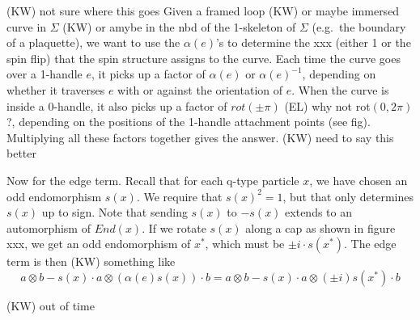 \documentclass[12pt,a4paper]{article}
\newcommand\be            {\begin{equation}}
\newcommand\ee            {\end{equation}}
\newcommand{\kw}[1]{{\color{kwcolor}\footnotesize{(KW) #1}}}
\newcommand{\ethan}[1]{{\color{amethyst}\footnotesize{(EL) #1}}}
\begin{document}
\kw{not sure where this goes}
Given a framed loop \kw{or maybe immersed curve} in $\Sigma$ 
\kw{or amybe in the nbd of the 1-skeleton of $\Sigma$} (e.g.\ the boundary of a plaquette), 
we want to use the $\alpha(e)$'s
to determine the xxx (either 1 or the spin flip) that the spin structure assigns to the curve.
Each time the curve goes over a 1-handle $e$, it picks up a factor of $\alpha(e)$
or $\alpha(e)^{-1}$, depending on whether it traverses $e$ with or against the orientation of $e$.
When the curve is inside a 0-handle, it also picks up a factor
of $rot(\pm\pi)$ \ethan{why not rot$(0,2\pi)$?}, depending on the positions of the 1-handle attachment points (see fig).
Multiplying all these factors together gives the answer.
\kw{need to say this better}

Now for the edge term.
Recall that for each q-type particle $x$, we have chosen an odd endomorphism $s(x)$.
We require that $s(x)^2 = 1$, but that only determines $s(x)$ up to sign.
Note that sending $s(x)$ to $-s(x)$ extends to an automorphism of $End(x)$.
If we rotate $s(x)$ along a cap as shown in figure xxx, we get an odd endomorphism of $x^*$,
which must be $\pm i \cdot s(x^*)$.
The edge term is then \kw{something like}
\be
	a\otimes b - s(x)\cdot a \otimes (\alpha(e)s(x)) \cdot b = a\otimes b - s(x)\cdot a \otimes (\pm i) s(x^*) \cdot b
\ee


\kw{out of time}
 
 


 
\end{document}
